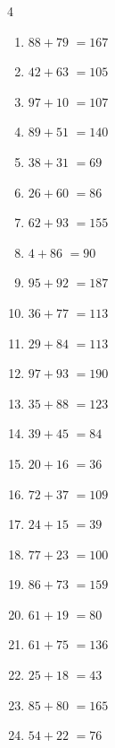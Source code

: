 \begin{multicols}{4}
\begin{enumerate}
  \item $88+79$
        $=167$

  \item $42+63$
        $=105$

  \item $97+10$
        $=107$

  \item $89+51$
        $=140$

  \item $38+31$
        $=69$

  \item $26+60$
        $=86$

  \item $62+93$
        $=155$

  \item $4+86$
        $=90$

  \item $95+92$
        $=187$

  \item $36+77$
        $=113$

  \item $29+84$
        $=113$

  \item $97+93$
        $=190$

  \item $35+88$
        $=123$

  \item $39+45$
        $=84$

  \item $20+16$
        $=36$

  \item $72+37$
        $=109$

  \item $24+15$
        $=39$

  \item $77+23$
        $=100$

  \item $86+73$
        $=159$

  \item $61+19$
        $=80$

  \item $61+75$
        $=136$

  \item $25+18$
        $=43$

  \item $85+80$
        $=165$

  \item $54+22$
        $=76$


\end{enumerate}
\end{multicols}
